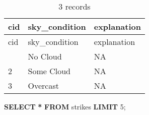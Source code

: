 \documentclass[
]{article}
\newenvironment{Shaded}{\begin{snugshade}}{\end{snugshade}}
\newcommand{\DecValTok}[1]{\textcolor[rgb]{0.00,0.00,0.81}{#1}}
\newcommand{\KeywordTok}[1]{\textcolor[rgb]{0.13,0.29,0.53}{\textbf{#1}}}
\newcommand{\NormalTok}[1]{#1}
\newcommand{\OperatorTok}[1]{\textcolor[rgb]{0.81,0.36,0.00}{\textbf{#1}}}
\begin{document}
\begin{longtable}[]{@{}lll@{}}
\caption{3 records}\tabularnewline
\toprule\noalign{}
cid & sky\_condition & explanation \\
\midrule\noalign{}
\endfirsthead
\toprule\noalign{}
cid & sky\_condition & explanation \\
\midrule\noalign{}
\endhead
\bottomrule\noalign{}
\endlastfoot
1 & No Cloud & NA \\
2 & Some Cloud & NA \\
3 & Overcast & NA \\
\end{longtable}

\begin{Shaded}
\begin{Highlighting}[]
\KeywordTok{SELECT} \OperatorTok{*} \KeywordTok{FROM}\NormalTok{ strikes }\KeywordTok{LIMIT} \DecValTok{5}\NormalTok{;}
\end{Highlighting}
\end{Shaded}
\end{document}
